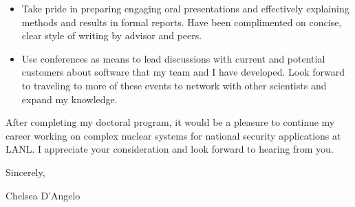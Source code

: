 \begin{center}
\begin{minipage}{\textwidth}
\begin{itemize}[leftmargin=.875in,rightmargin=.75in,itemsep=1.0mm]
               \item Take pride in preparing engaging oral presentations and 
                     effectively explaining methods and results in 
                     formal reports.  Have been 
                     complimented on concise, clear
                     style of writing by advisor and peers. 
	       \item Use conferences as means to lead
		       discussions with current and potential customers about
		       software that my team and I have developed. Look forward to traveling to
		       more of these events to network with other
			scientists and expand my knowledge.
		       


\end{itemize} 

\vspace{4mm} %



After completing my doctoral program, it would be a pleasure 
to continue my career working on complex nuclear systems for
national security applications at LANL.  
I appreciate your consideration and look forward to hearing from you. 
  \vspace{4mm}
  
  Sincerely, \\ \vspace{-4mm}
  
  
  Chelsea D'Angelo
  
  \endgroup
  
  \end{minipage}
\end{center}
